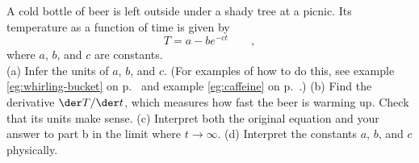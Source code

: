 A cold bottle of beer is left outside under a shady tree
at a picnic. Its temperature as a function of time is given
by
\begin{equation*}
  T = a - b e^{-ct} \qquad ,
\end{equation*}
where $a$, $b$, and $c$ are constants.\\
(a) Infer the units of $a$, $b$, and $c$. (For examples of how to do this, see
example \ref{eg:whirling-bucket} on p.~\pageref{eg:whirling-bucket} and
example \ref{eg:caffeine} on p.~\pageref{eg:caffeine}.)\hwendpart
(b) Find the derivative $\der T/\der t$, which measures how fast the beer
is warming up. Check that its units make sense.\hwendpart
(c) Interpret both the original equation and
your answer to part b in the limit where $t\rightarrow\infty$.\hwendpart
(d) Interpret the constants $a$, $b$, and $c$ physically.
